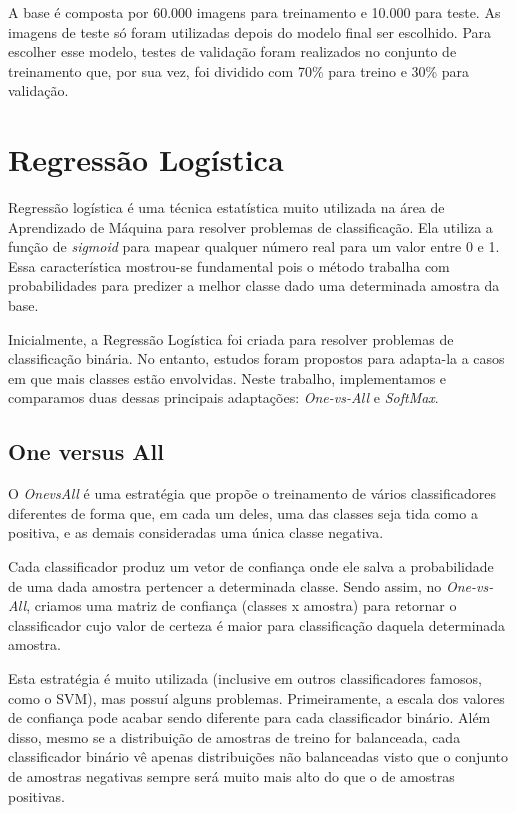 \documentclass[conference]{IEEEtran}
\begin{document}
	A base é composta por 60.000 imagens para treinamento e 10.000 para teste. As imagens de teste só foram utilizadas depois do modelo final ser escolhido. Para escolher esse modelo, testes de validação foram realizados no conjunto de treinamento que, por sua vez, foi dividido com 70\% para treino e 30\% para validação.
	
\section{Regressão Logística}

Regressão logística é uma técnica estatística muito utilizada na área de Aprendizado de Máquina para resolver problemas de classificação. Ela utiliza a função de \textit{sigmoid} para mapear qualquer número real para um valor entre 0 e 1. Essa característica mostrou-se fundamental pois o método trabalha com probabilidades para predizer a melhor classe dado uma determinada amostra da base. \par

Inicialmente, a Regressão Logística foi criada para resolver problemas de classificação binária. No entanto, estudos foram propostos para adapta-la a casos em que mais classes estão envolvidas. Neste trabalho, implementamos e comparamos duas dessas principais adaptações: \textit{One-vs-All} e \textit{SoftMax}.

\subsection{One versus All}
O \textit{OnevsAll} é uma estratégia que propõe o treinamento de vários classificadores diferentes de forma que, em cada um deles, uma das classes seja tida como a positiva, e as demais consideradas uma única classe negativa.\par
Cada classificador produz um vetor de confiança onde ele salva a probabilidade de uma dada amostra pertencer a determinada classe. Sendo assim, no \textit{One-vs-All}, criamos uma matriz de confiança (classes x amostra) para retornar o classificador cujo valor de certeza é maior para classificação daquela determinada amostra.\par
Esta estratégia é muito utilizada (inclusive em outros classificadores famosos, como o SVM), mas possuí alguns problemas. Primeiramente, a escala dos valores de confiança pode acabar sendo diferente para cada classificador binário. Além disso, mesmo se a distribuição de amostras de treino for balanceada, cada classificador binário vê apenas distribuições não balanceadas visto que o conjunto de amostras negativas sempre será muito mais alto do que o de amostras positivas.
\end{document}
